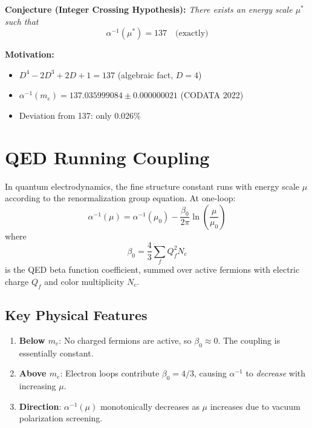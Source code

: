 \documentclass[11pt,a4paper]{article}
\begin{document}
\textbf{Conjecture (Integer Crossing Hypothesis):}
\textit{There exists an energy scale $\mu^*$ such that}
\begin{equation}
\alpha^{-1}(\mu^*) = 137 \quad \text{(exactly)}
\end{equation}

\textbf{Motivation:}
\begin{itemize}
    \item $D^4 - 2D^3 + 2D + 1 = 137$ (algebraic fact, $D=4$)
    \item $\alpha^{-1}(m_e) = 137.035999084 \pm 0.000000021$ (CODATA 2022)
    \item Deviation from 137: only 0.026\%
\end{itemize}

\section{QED Running Coupling}

In quantum electrodynamics, the fine structure constant runs with energy scale $\mu$ according to the renormalization group equation. At one-loop:
\begin{equation}
\alpha^{-1}(\mu) = \alpha^{-1}(\mu_0) - \frac{\beta_0}{2\pi} \ln\left(\frac{\mu}{\mu_0}\right)
\end{equation}
where
\begin{equation}
\beta_0 = \frac{4}{3} \sum_f Q_f^2 N_c
\end{equation}
is the QED beta function coefficient, summed over active fermions with electric charge $Q_f$ and color multiplicity $N_c$.

\subsection{Key Physical Features}

\begin{enumerate}
    \item \textbf{Below $m_e$}: No charged fermions are active, so $\beta_0 \approx 0$. The coupling is essentially constant.
    
    \item \textbf{Above $m_e$}: Electron loops contribute $\beta_0 = 4/3$, causing $\alpha^{-1}$ to \textit{decrease} with increasing $\mu$.
    
    \item \textbf{Direction}: $\alpha^{-1}(\mu)$ monotonically decreases as $\mu$ increases due to vacuum polarization screening.
\end{enumerate}
\end{document}
